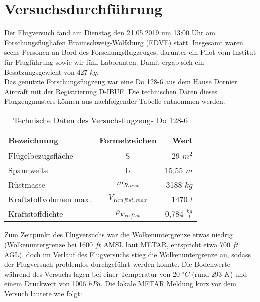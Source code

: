 \chapter{Versuchsdurchführung}
\label{chapter:versuch}
Der Flugversuch fand am  Dienstag den 21.05.2019 um 13:00 Uhr am Forschungsflughafen Braunschweig-Wolfsburg (EDVE) statt. Insgesamt waren sechs Personen an Bord des Forschungsflugzeuges, darunter ein Pilot vom Institut für Flugführung sowie wir fünf Laboranten. Damit ergab sich ein Besatzungsgewicht von 427 $kg$.\\
Das genutzte Forschungsflugzeug war eine Do 128-6 aus dem Hause Dornier Aircraft mit der Registrierung D-IBUF. Die technischen Daten dieses Flugzeugmusters können aus nachfolgender Tabelle entnommen werden:\\

\begin{table}[h]
	\centering
	\begin{tabular}{|l|c|r|}
		\hline
		\textbf{Bezeichnung}         	& \textbf{Formelzeichen} & \textbf{Wert}           		\\ \hline
		Flügelbezugsfläche           	& S                      & 29 $m^2$ 					\\ \hline
		Spannweite                   	& b                      & 15,55 $m$                 	\\ \hline
		Rüstmasse                    	& $m_{Ruest}$             & 3188 $kg$                 	\\ \hline
		Kraftstoffvolumen max. 			& $V_{Kraftst,max}$      & 1470 $l$            			\\ \hline
		Kraftstoffdichte             	& $\rho_{Kraftst}$       & 0,784 $\frac{kg}{l}$      	\\ \hline
	\end{tabular}
	\caption{Technische Daten des Versuchsflugzeugs Do 128-6}
\end{table}
\vspace{0.3cm}

\noindent Zum Zeitpunkt des Flugversuchs war die Wolkenuntergrenze etwas niedrig (Wolkenuntergrenze bei 1600 $ft$ AMSL laut METAR, entspricht etwa 700 $ft$ AGL), doch im Verlauf des Flugversuchs stieg die Wolkenuntergrenze an, sodass der Flugversuch problemlos durchgeführt werden konnte. Die Bodenwerte während des Versuchs lagen bei einer Temperatur von 20 $^\circ C$ (rund 293 $K$) und einem Druckwert von 1006 $hPa$. Die lokale METAR Meldung kurz vor dem Versuch lautete wie folgt:\\\\


